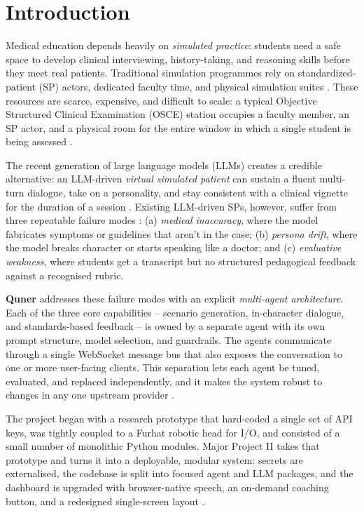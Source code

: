\documentclass{article}
\begin{document}
\section{Introduction}

Medical education depends heavily on \emph{simulated practice}: students need a safe space to develop clinical interviewing, history-taking, and reasoning skills before they meet real patients. Traditional simulation programmes rely on standardized-patient (SP) actors, dedicated faculty time, and physical simulation suites \cite{Portovaras2024CurrentTA}. These resources are scarce, expensive, and difficult to scale: a typical Objective Structured Clinical Examination (OSCE) station occupies a faculty member, an SP actor, and a physical room for the entire window in which a single student is being assessed \cite{Azzara2023PeranPP}.

The recent generation of large language models (LLMs) creates a credible alternative: an LLM-driven \emph{virtual simulated patient} can sustain a fluent multi-turn dialogue, take on a personality, and stay consistent with a clinical vignette for the duration of a session \cite{Topsakal2023CreatingLL}. Existing LLM-driven SPs, however, suffer from three repeatable failure modes \cite{Plale2013BigDO}: (a) \emph{medical inaccuracy}, where the model fabricates symptoms or guidelines that aren't in the case; (b) \emph{persona drift}, where the model breaks character or starts speaking like a doctor; and (c) \emph{evaluative weakness}, where students get a transcript but no structured pedagogical feedback against a recognised rubric.

\textbf{Quner} addresses these failure modes with an explicit \emph{multi-agent architecture}. Each of the three core capabilities -- scenario generation, in-character dialogue, and standards-based feedback -- is owned by a separate agent with its own prompt structure, model selection, and guardrails. The agents communicate through a single WebSocket message bus that also exposes the conversation to one or more user-facing clients. This separation lets each agent be tuned, evaluated, and replaced independently, and it makes the system robust to changes in any one upstream provider \cite{Cheptsov2013IntroducingAN}.

The project began with a research prototype that hard-coded a single set of API keys, was tightly coupled to a Furhat robotic head for I/O, and consisted of a small number of monolithic Python modules. Major Project II takes that prototype and turns it into a deployable, modular system: secrets are externalised, the codebase is split into focused agent and LLM packages, and the dashboard is upgraded with browser-native speech, an on-demand coaching button, and a redesigned single-screen layout \cite{Ren2024AdvancementsAA}.
\end{document}

